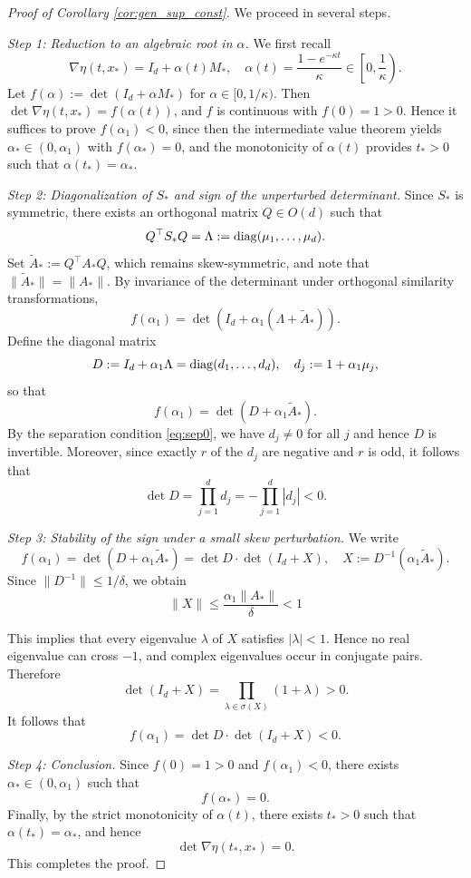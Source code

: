 \documentclass[11pt]{amsart}
\numberwithin{equation}{section}
\theoremstyle{definition}
\theoremstyle{remark}
\numberwithin{equation}{section}
\newcommand{\lt}{\left}
\newcommand{\rt}{\right}
\newcommand{\diag}{{\rm diag}}
\renewcommand{\le}{\leqslant}
\begin{document}
\begin{proof}[Proof of Corollary \ref{cor:gen_sup_const}]
We proceed in several steps. 

\medskip
\noindent
\textit{Step 1: Reduction to an algebraic root in $\alpha$.}
We first recall
\[
\nabla\eta(t,x_*)=I_d+\alpha(t)M_*, \quad \alpha(t)=\frac{1-e^{-\kappa t}}{\kappa}\in \lt[0,\frac1\kappa\rt).
\]
Let $f(\alpha):=\det(I_d+\alpha M_*)$ for $\alpha\in[0,1/\kappa)$. Then $\det\nabla\eta(t,x_*)=f(\alpha(t))$, and $f$ is continuous with $f(0)=1>0$. Hence it suffices to prove $f(\alpha_1)<0$, since then the intermediate value theorem yields $\alpha_*\in(0,\alpha_1)$ with $f(\alpha_*)=0$, and the monotonicity of $\alpha(t)$ provides $t_*>0$ such that $\alpha(t_*)=\alpha_*$.

\medskip
\noindent
\textit{Step 2: Diagonalization of $S_*$ and sign of the unperturbed determinant.}
Since $S_*$ is symmetric, there exists an orthogonal matrix $Q\in O(d)$ such that
\[
Q^\top S_*Q=\Lambda:=\diag(\mu_1,\dots,\mu_d).
\]
Set $\widetilde A_*:=Q^\top A_*Q$, which remains skew-symmetric, and note that $\|\widetilde A_*\|=\|A_*\|$.
By invariance of the determinant under orthogonal similarity transformations,
\[
f(\alpha_1)=\det \lt(I_d+\alpha_1(\Lambda+\widetilde A_*)\rt).
\]
Define the diagonal matrix
\[
D:=I_d+\alpha_1\Lambda=\diag(d_1,\dots,d_d), \quad d_j:=1+\alpha_1\mu_j,
\]
so that
\[
f(\alpha_1)=\det(D+\alpha_1\widetilde A_*).
\]
By the separation condition \eqref{eq:sep0}, we have $d_j\neq0$ for all $j$ and hence $D$ is invertible.
Moreover, since exactly $r$ of the $d_j$ are negative and $r$ is odd, it follows that
\[
\det D=\prod_{j=1}^d d_j= -\prod_{j=1}^d |d_j|< 0.
\]

\medskip
\noindent
\textit{Step 3: Stability of the sign under a small skew perturbation.}
We write
\[
f(\alpha_1)=\det(D+\alpha_1\widetilde A_*)
=\det D \cdot \det(I_d+X),
\quad
X:=D^{-1}(\alpha_1\widetilde A_*).
\]
Since $\|D^{-1}\|\le 1/\delta$, we obtain
\[
\|X\|\le \frac{\alpha_1\|A_*\|}{\delta}<1
\]

This implies that every eigenvalue $\lambda$ of $X$ satisfies $|\lambda|<1$. Hence no real eigenvalue can cross $-1$, and complex eigenvalues occur in conjugate pairs. Therefore
\[
\det(I_d+X)=\prod_{\lambda\in\sigma(X)}(1+\lambda)>0.
\]
It follows that
\[
f(\alpha_1)=\det D \cdot \det(I_d+X)<0.
\]

\medskip
\noindent
\textit{Step 4: Conclusion.}
Since $f(0)=1>0$ and $f(\alpha_1)<0$, there exists $\alpha_*\in(0,\alpha_1)$ such that
\[
f(\alpha_*)=0.
\]
Finally, by the strict monotonicity of $\alpha(t)$, there exists $t_*>0$ such that $\alpha(t_*)=\alpha_*$, and hence
\[
\det\nabla\eta(t_*,x_*)=0.
\]
This completes the proof.
\end{proof}
\end{document}
